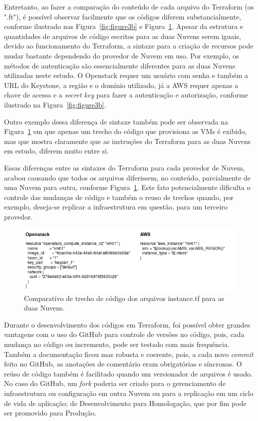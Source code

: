 \documentclass[12pt]{article}
\begin{document}
	Entretanto, ao fazer a comparação do conteúdo de cada arquivo do Terraform (os ".ft"), é possível observar facilmente que os códigos diferem substancialmente, conforme ilustrado nas Figura~\ref{fig:figure3b} e Figura~\ref{fig:figure3}. Apesar da estrutura e quantidades de arquivos de código escritos para as duas Nuvens serem iguais, devido ao funcionamento do Terraform, a sintaxe para a criação de recursos pode mudar bastante dependendo do provedor de Nuvem em uso. Por exemplo, os métodos de autenticação são essencialmente diferentes para as duas Nuvens utilizadas neste estudo. O Openstack requer um usuário com senha e também a URL do Keystone, a região e o domínio utilizado, já a AWS requer apenas a chave de acesso e a \textit{secret key} para fazer a autenticação e autorização, conforme ilustrado na Figura~\ref{fig:figure3b}. 
	
	Outro exemplo dessa diferença de sintaxe também pode ser observada na Figura~\ref{fig:figure3} em que apenas um trecho do código que provisiona as VMs é exibido, mas que mostra claramente que as instruções do Terraform para as duas Nuvens em estudo, diferem muito entre si.
	
	Essas diferenças entre as sintaxes do Terraform para cada provedor de Nuvem, acabou causando que todos os arquivos diferissem, no conteúdo, parcialmente de uma Nuvem para outra, conforme Figura~\ref{fig:figure3}. Este fato potencialmente dificulta o controle das mudanças de código e também o reuso de trechos quando, por exemplo, deseja-se replicar a infraestrutura em questão, para um terceiro provedor.
		
	\begin{figure}[ht]
		\centering
		\includegraphics[width=0.97\linewidth]{figuras/Figure3.png}
		\caption{Comparativo de trecho de código dos arquivos instance.tf para as duas Nuvens.}
		\label{fig:figure3}
	\end{figure}

	Durante o desenvolvimento dos códigos em Terraform, foi possível obter grandes vantagens com o uso do GitHub para controle de versões no código, pois, cada mudança no código ou incremento, pode ser testado com mais frequência. Também a documentação ficou mas robusta e coerente, pois, a cada novo \textit{commit} feito no GitHub, as anotações de comentário eram obrigatórias e síncronas. O reúso de código também é facilitado quando um versionador de arquivos é usado. No caso do GitHub, um \textit{fork} poderia ser criado para o gerenciamento de infraestrutura ou configuração em outra Nuvem ou para a replicação em um ciclo de vida de aplicação; de Desenvolvimento para Homologação, que por fim pode ser promovido para Produção.
	
\end{document}
